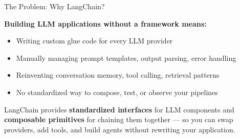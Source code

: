 \documentclass[aspectratio=169,11pt]{beamer}
\begin{document}
\begin{frame}{The Problem: Why LangChain?}

\textbf{Building LLM applications without a framework means:}

\begin{itemize}\setlength{\itemsep}{2pt}
  \item Writing custom glue code for every LLM provider
  \item Manually managing prompt templates, output parsing, error handling
  \item Reinventing conversation memory, tool calling, retrieval patterns
  \item No standardized way to compose, test, or observe your pipelines
\end{itemize}

\vspace{0.2cm}

\begin{conceptbox}
LangChain provides \textbf{standardized interfaces} for LLM components and \textbf{composable primitives} for chaining them together --- so you can swap providers, add tools, and build agents without rewriting your application.
\end{conceptbox}
\end{frame}
\end{document}
